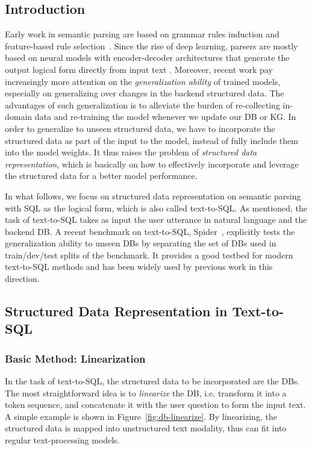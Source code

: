 \documentclass[11pt,dvipdfm]{article}
\begin{document}
\subsection{Introduction}
Early work in semantic parsing are based on grammar rules induction and feature-based rule selection~\cite{GeoQuery:Zelle1996LearningTP,Artzi2013UWSPF}.
Since the rise of deep learning, parsers are mostly based on neural models with encoder-decoder architectures that generate the output logical form directly from input text \cite{Dong2016LanguageTL,Dong2018CoarsetoFineDF,Cheng2019LearningAE}.
Moreover, recent work pay increasingly more attention on the \textit{generalization ability} of trained models, especially on generalizing over changes in the backend structured data. The advantages of such generalization is to alleviate the burden of re-collecting in-domain data and re-training the model whenever we update our DB or KG. In order to generalize to unseen structured data, we have to incorporate the structured data as part of the input to the model, instead of fully include them into the model weights. It thus raises the problem of \textit{structured data representation}, which is basically on how to effectively incorporate and leverage the structured data for a better model performance.

In what follows, we focus on structured data representation on semantic parsing with SQL as the logical form, which is also called text-to-SQL. As mentioned, the task of text-to-SQL takes as input the user utterance in natural language and the backend DB. A recent benchmark on text-to-SQL, Spider~\cite{yu2018spider}, explicitly tests the generalization ability to unseen DBs by separating the set of DBs used in train/dev/test splits of the benchmark. It provides a good testbed for modern text-to-SQL methods and has been widely used by previous work in this direction. 

\subsection{Structured Data Representation in Text-to-SQL}
\subsubsection{Basic Method: Linearization}
In the task of text-to-SQL, the structured data to be incorporated are the DBs.
The most straightforward idea is to \textit{linearize} the DB, i.e. transform it into a token sequence, and concatenate it with the user question to form the input text. A simple example is shown in Figure~\ref{fig:db-linearize}. By linearizing, the structured data is mapped into unstructured text modality, thus can fit into regular text-processing models.
\end{document}

